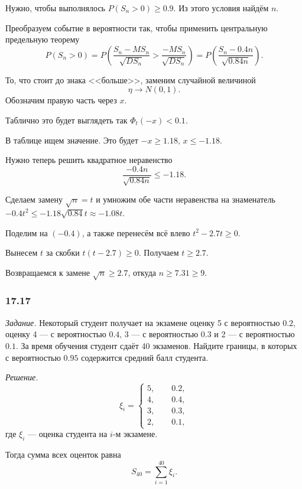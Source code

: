 Нужно, чтобы выполнялось $P \left( S_n > 0 \right) \geq 0.9$.
Из этого условия найдём $n$.

Преобразуем событие в вероятности так, чтобы применить центральную предельную теорему
$$P \left( S_n > 0 \right) =
  P \left( \frac{S_n - MS_n}{ \sqrt{DS_n}} > \frac{-MS_n}{ \sqrt{DS_n}} \right) =
  P \left( \frac{S_n - 0.4n}{ \sqrt{0.84n}} \right).$$

То, что стоит до знака <<больше>>, заменим случайной величиной
$$ \eta \to N \left( 0, 1 \right).$$
Обозначим правую часть через $x$.

Таблично это будет выглядеть так $ \Phi_t \left( -x \right) < 0.1$.

В таблице ищем значение.
Это будет $-x \geq 1.18, \, x \leq -1.18$.

Нужно теперь решить квадратное неравенство
$$ \frac{-0.4n}{ \sqrt{0.84n}} \leq -1.18.$$

Сделаем замену $ \sqrt{n} = t$ и умножим обе части неравенства на знаменатель
$-0.4t^2 \leq
  -1.18 \sqrt{0.84}t \approx
  -1.08t$.

Поделим на $ \left( -0.4 \right) $, а также перенесём всё влево $t^2 - 2.7t \geq 0$.

Вынесем $t$ за скобки $t \left( t - 2.7 \right) \geq 0$.
Получаем $t \geq 2.7$.

Возвращаемся к замене $ \sqrt{n} \geq 2.7$, откуда $n \geq 7.31 \geq 9$.

\subsubsection*{17.17}

\textit{Задание.} Некоторый студент получает на экзамене оценку 5 с вероятностью $0.2$, оценку 4 ---
с вероятностью $0.4, \, 3$ --- с вероятностью $0.3$ и 2 --- с вероятностью $0.1$.
За время обучения студент сдаёт 40 экзаменов.
Найдите границы, в которых с вероятностью $0.95$ содержится средний балл студента.

\textit{Решение.}
$$ \xi_i =
\begin{cases}
  5, \qquad 0.2, \\
  4, \qquad 0.4, \\
  3, \qquad 0.3, \\
  2, \qquad 0.1,
\end{cases}$$
где $ \xi_i$ --- оценка студента на $i$-м экзамене.

Тогда сумма всех оценток равна
$$S_{40} =
  \sum \limits_{i = 1}^{40} \xi_i.$$

